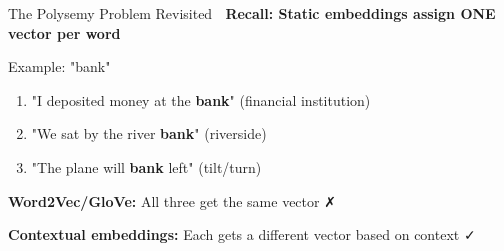 \documentclass[aspectratio=169]{beamer}
\begin{document}
\begin{frame}[shrink=5]{The Polysemy Problem Revisited 🤔}
\textbf{Recall: Static embeddings assign ONE vector per word}

\vspace{1em}

\begin{exampleblock}{Example: "bank"}
\begin{enumerate}\setlength{\itemsep}{0pt}
    \item "I deposited money at the \textbf{bank}" \hfill (financial institution)
    \item "We sat by the river \textbf{bank}" \hfill (riverside)
    \item "The plane will \textbf{bank} left" \hfill (tilt/turn)
\end{enumerate}

\vspace{0.5em}
\textbf{Word2Vec/GloVe:} All three get \alert{the same vector} ✗

\textbf{Contextual embeddings:} Each gets a \alert{different vector} based on context ✓
\end{exampleblock}

\vspace{1em}

\begin{center}
\end{center}
\end{frame}
\end{document}
